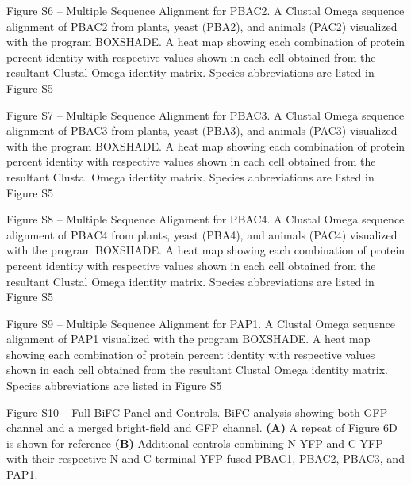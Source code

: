 Figure S6 – Multiple Sequence Alignment for PBAC2. A Clustal Omega \citep{sievers14} sequence alignment of PBAC2 from plants, yeast (PBA2), and animals (PAC2) visualized with the program BOXSHADE. A heat map showing each combination of protein percent identity with respective values shown in each cell obtained from the resultant Clustal Omega identity matrix. Species abbreviations are listed in Figure S5

Figure S7 – Multiple Sequence Alignment for PBAC3. A Clustal Omega \citep{sievers14} sequence alignment of PBAC3 from plants, yeast (PBA3), and animals (PAC3) visualized with the program BOXSHADE. A heat map showing each combination of protein percent identity with respective values shown in each cell obtained from the resultant Clustal Omega identity matrix. Species abbreviations are listed in Figure S5

Figure S8 – Multiple Sequence Alignment for PBAC4. A Clustal Omega \citep{sievers14} sequence alignment of PBAC4 from plants, yeast (PBA4), and animals (PAC4) visualized with the program BOXSHADE. A heat map showing each combination of protein percent identity with respective values shown in each cell obtained from the resultant Clustal Omega identity matrix. Species abbreviations are listed in Figure S5

Figure S9 – Multiple Sequence Alignment for PAP1. A Clustal Omega \citep{sievers14} sequence alignment of PAP1 visualized with the program BOXSHADE. A heat map showing each combination of protein percent identity with respective values shown in each cell obtained from the resultant Clustal Omega identity matrix. Species abbreviations are listed in Figure S5

Figure S10 – Full BiFC Panel and Controls. BiFC analysis showing both GFP channel and a merged bright-field and GFP channel. \textbf{(A)} A repeat of Figure 6D is shown for reference \textbf{(B)} Additional controls combining N-YFP and C-YFP with their respective N and C terminal YFP-fused PBAC1, PBAC2, PBAC3, and PAP1.

